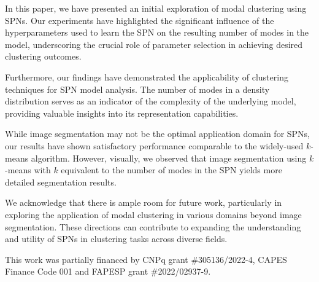 \documentclass[accepted]{tpm2023} %
\begin{document}
In this paper, we have presented an initial exploration of modal clustering using SPNs. Our experiments have highlighted the significant influence of the hyperparameters used to learn the SPN on the resulting number of modes in the model, underscoring the crucial role of parameter selection in achieving desired clustering outcomes.

Furthermore, our findings have demonstrated the applicability of clustering techniques for SPN model analysis. The number of modes in a density distribution serves as an indicator of the complexity of the underlying model, providing valuable insights into its representation capabilities.

While image segmentation may not be the optimal application domain for SPNs, our results have shown satisfactory performance comparable to the widely-used $k$-means algorithm. However, visually, we observed that image segmentation using $k$-means with $k$ equivalent to the number of modes in the SPN yields more detailed segmentation results.

We acknowledge that there is ample room for future work, particularly in exploring the application of modal clustering in various domains beyond image segmentation. These directions can contribute to expanding the understanding and utility of SPNs in clustering tasks across diverse fields.

\begin{acknowledgements}

  This work was partially financed by CNPq grant \#305136/2022-4, CAPES Finance Code 001 and FAPESP grant \#2022/02937-9.
\end{acknowledgements}

\end{document}
